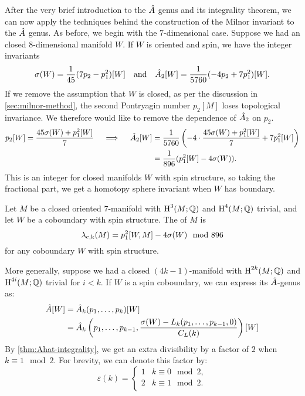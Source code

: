 After the very brief introduction to the ${\hat{A}}$ genus and its integrality theorem, we can now apply the techniques behind the construction of the Milnor invariant to the ${\hat{A}}$ genus. As before, we begin with the $7$-dimensional case. Suppose we had an closed $8$-dimensional manifold $W$. If $W$ is oriented and spin, we have the integer invariants
\[
	\sigma(W) = \frac{1}{45}(7p_2- p_1^2)[W]\quad\textrm{and}\quad{\hat{A}}_2[W] = \frac{1}{5760}(-4p_2 + 7p_1^2)[W].
\]
If we remove the assumption that $W$ is closed, as per the discussion in \cref{sec:milnor-method}, the second Pontryagin number $p_2[M]$ loses topological invariance. We therefore would like to remove the dependence of ${\hat{A}}_2$ on $p_2$. 
\[
\begin{aligned}
	p_2[W] = \frac{45\sigma(W) +p_1^2[W]}{7}\quad\implies\quad 
	{\hat{A}}_2[W] &= \frac{1}{5760}\left(-4\cdot \frac{45\sigma(W) + p_1^2[W]}{7} + 7p_1^2[W]\right)\\
						 &=\frac{1}{896}(p_1^2[W]-4\sigma(W)).
\end{aligned}
\]
This is an integer for closed manifolds $W$ with spin structure, so taking the fractional part, we get a homotopy sphere invariant when $W$ has boundary.

\begin{definition}\label{def:eells-kupier-7-dimension}
	Let $M$ be a closed oriented $7$-manifold with $\operatorname{H}^3(M;\mathbb{Q})$ and $\operatorname{H}^4(M;\mathbb{Q})$ trivial, and let $W$ be a coboundary with spin structure. The  of $M$ is
	\[
		\lambda_{\mathrm{e,k}}(M) = p_1^2[W, M]-4\sigma(W)\mod 896
	\]
	for any coboundary $W$ with spin structure.
\end{definition}

More generally, suppose we had a closed $(4k-1)$-manifold with $\operatorname{H}^{2k}(M;\mathbb{Q})$ and $\operatorname{H}^{4i}(M;\mathbb{Q})$ trivial for $i<k$. If $W$ is a spin coboundary, we can express its ${\hat{A}}$-genus as:
\[
	\begin{aligned}
	{\hat{A}}[W]&={\hat{A}}_k(p_1,\ldots, p_k)[W]\\
					&= {\hat{A}}_k\left(p_1, \ldots, p_{k-1}, \frac{\sigma(W)-L_k(p_1,\ldots, p_{k-1},0)}{C_L(k)}\right)[W]
	\end{aligned}
\]
By \cref{thm:Ahat-integrality}, we get an extra divisibility by a factor of $2$ when $k\equiv 1\mod 2$. For brevity, we can denote this factor by:
\[
	\varepsilon(k) = 
	\begin{cases}
		1 & k\equiv 0 \mod 2,\\
		2 & k\equiv 1 \mod 2.\\
	\end{cases}
\] 

